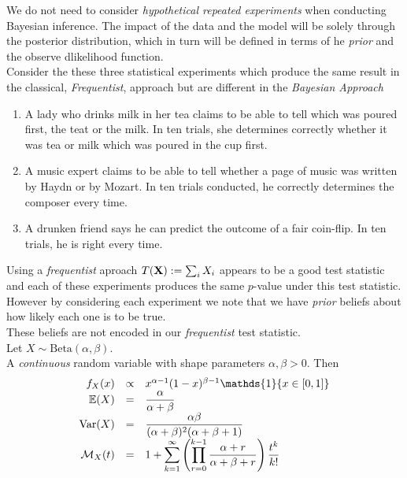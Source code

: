 \documentclass[11pt,a4paper]{article}
\begin{document}
We do not need to consider \textit{hypothetical repeated experiments} when conducting Bayesian inference. The impact of the data and the model will be solely through the posterior distribution, which in turn will be defined in terms of he \textit{prior} and the observe dlikelihood function.\\

Consider the these three statistical experiments which produce the same result in the classical, \textit{Frequentist}, approach but are different in the \textit{Bayesian Approach}
\begin{enumerate}
	\item A lady who drinks milk in her tea claims to be able to tell which was poured first, the teat or the milk. In ten trials, she determines correctly whether it was tea or milk which was poured in the cup first.
	\item A music expert claims to be able to tell whether a page of music was written by Haydn or by Mozart. In ten trials conducted, he correctly determines the composer every time.
	\item A drunken friend says he can predict the outcome of a fair coin-flip. In ten trials, he is right every time.
\end{enumerate}
Using a \textit{frequentist} aproach $T(\textbf{X}):=\sum_iX_i$ appears to be a good test statistic and each of these experiments produces the same $p$-value under this test statistic.\\
However by considering each experiment we note that we have \textit{prior} beliefs about how likely each one is to be true.\\
These beliefs are not encoded in our \textit{frequentist} test statistic.\\

Let $X\sim\text{Beta}(\alpha,\beta)$.\\
A \textit{continuous} random variable with shape parameters $\alpha,\beta>0$. Then
\[\begin{array}{rcl}
f_X(x)&\propto&x^{\alpha-1}(1-x)^{\beta-1}\mathds{1}\{x\in[0,1]\}\\
\expect(X)&=&\dfrac{\alpha}{\alpha+\beta}\\
\var(X)&=&\dfrac{\alpha\beta}{(\alpha+\beta)^2(\alpha+\beta+1)}\\
\mathcal{M}_X(t)&=&1+{\displaystyle\sum_{k=1}^\infty\left(\prod_{r=0}^{k-1}\dfrac{\alpha+r}{\alpha+\beta+r}\right)\dfrac{t^k}{k!}}
\end{array}\]
\end{document}
